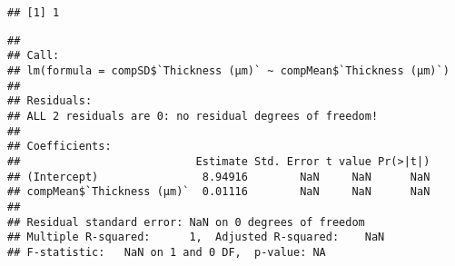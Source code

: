 \documentclass[
]{article}
\newenvironment{Shaded}{\begin{snugshade}}{\end{snugshade}}
\newcommand{\AttributeTok}[1]{\textcolor[rgb]{0.77,0.63,0.00}{#1}}
\newcommand{\ConstantTok}[1]{\textcolor[rgb]{0.00,0.00,0.00}{#1}}
\newcommand{\FunctionTok}[1]{\textcolor[rgb]{0.00,0.00,0.00}{#1}}
\newcommand{\NormalTok}[1]{#1}
\newcommand{\OtherTok}[1]{\textcolor[rgb]{0.56,0.35,0.01}{#1}}
\newcommand{\SpecialCharTok}[1]{\textcolor[rgb]{0.00,0.00,0.00}{#1}}
\newcommand{\StringTok}[1]{\textcolor[rgb]{0.31,0.60,0.02}{#1}}
\begin{document}
\begin{Shaded}
\end{Shaded}

\begin{verbatim}
## [1] 1
\end{verbatim}

\begin{Shaded}
\end{Shaded}

\begin{verbatim}
## 
## Call:
## lm(formula = compSD$`Thickness (μm)` ~ compMean$`Thickness (μm)`)
## 
## Residuals:
## ALL 2 residuals are 0: no residual degrees of freedom!
## 
## Coefficients:
##                           Estimate Std. Error t value Pr(>|t|)
## (Intercept)                8.94916        NaN     NaN      NaN
## compMean$`Thickness (μm)`  0.01116        NaN     NaN      NaN
## 
## Residual standard error: NaN on 0 degrees of freedom
## Multiple R-squared:      1,  Adjusted R-squared:    NaN 
## F-statistic:   NaN on 1 and 0 DF,  p-value: NA
\end{verbatim}

\begin{Shaded}
\end{Shaded}
\end{document}
